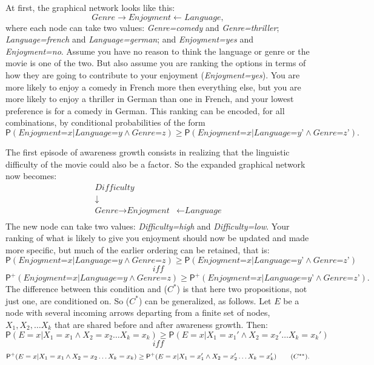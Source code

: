 \documentclass[
  11pt,
  dvipsnames,enabledeprecatedfontcommands]{scrartcl}
\newcommand{\pr}[1]{\ensuremath{\mathsf{P}(#1)}}
\newcommand{\ppr}[2]{\ensuremath{\mathsf{P}^{#1}(#2)}}
\begin{document}
At first, the graphical network looks like this:
\[\textit{Genre} \rightarrow \textit{Enjoyment} \leftarrow \textit{Language},\]
where each node can take two values: \textit{Genre=comedy} and
\textit{Genre=thriller}; \textit{Language=french} and
\textit{Language=german}; and \textit{Enjoyment=yes} and
\textit{Enjoyment=no}. Assume you have no reason to think the language
or genre or the movie is one of the two. But also assume you are ranking
the options in terms of how they are going to contribute to your
enjoyment (\textit{Enjoyment=yes}). You are more likely to enjoy a
comedy in French more then everything else, but you are more likely to
enjoy a thriller in German than one in French, and your lowest
preference is for a comedy in German. This ranking can be encoded, for
all combinations, by conditional probabilities of the form
\[\pr{\textit{Enjoyment=x} \vert \textit{Language=y} \wedge \textit{Genre=z}} \geq \pr{\textit{Enjoyment=x} \vert \textit{Language=y'} \wedge \textit{Genre=z'}}.\]

The first episode of awareness growth consists in realizing that the
linguistic difficulty of the movie could also be a factor. So the
expanded graphical network now becomes: \begin{align*}
\textit{Difficulty} &\\
\downarrow \\
\textit{Genre} \rightarrow \textit{Enjoyment} &\leftarrow \textit{Language}\\
\end{align*} \noindent The new node can take two values:
\textit{Difficulty=high} and \textit{Difficulty=low}. Your ranking of
what is likely to give you enjoyment should now be updated and made more
specific, but much of the earlier ordering can be retained, that is:
\[\pr{\textit{Enjoyment=x} \vert \textit{Language=y} \wedge \textit{Genre=z}} \geq \pr{\textit{Enjoyment=x} \vert \textit{Language=y'} \wedge \textit{Genre=z'}}\]
\[\textit{ iff }\]
\[\ppr{+}{\textit{Enjoyment=x} \vert \textit{Language=y} \wedge \textit{Genre=z}} \geq \ppr{+}{\textit{Enjoyment=x} \vert \textit{Language=y'} \wedge \textit{Genre=z'}}.\]
The difference between this condition and (\(C^*\)) is that here two
propositions, not just one, are conditioned on. So (\(C^*\)) can be
generalized, as follows. Let \(E\) be a node with several incoming
arrows departing from a finite set of nodes, \(X_1, X_2, \dots X_k\)
that are shared before and after awareness growth. Then:
\[\pr{E=x \vert X_1=x_1 \wedge X_2=x_2 \dots X_k=x_k} \geq \pr{E=x \vert X_1=x_1' \wedge X_2=x_2' \dots X_k=x_k'}\]
\[\textit{ iff }\]
\[\ppr{+}{E=x \vert X_1=x_1 \wedge X_2=x_2 \dots X_k=x_k} \geq \ppr{+}{E=x \vert X_1=x_1' \wedge X_2=x_2' \dots X_k=x_k'} \tag{$C^{**}$}.\]
\end{document}
